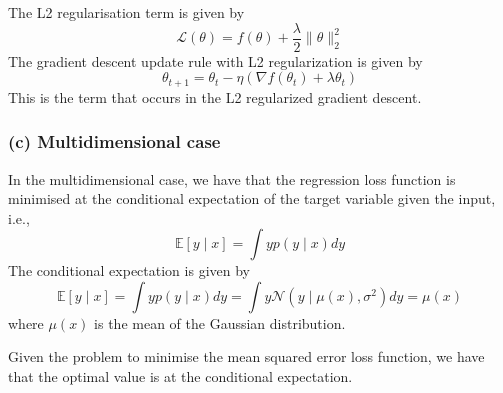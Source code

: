 The L2 regularisation term is given by
\begin{equation*}
      \mathcal{L}(\theta) = f(\theta) + \frac{\lambda}{2} \| \theta \|_2^2
\end{equation*}
The gradient descent update rule with L2 regularization is given by
\begin{equation*}
      \theta_{t+1} = \theta_t - \eta \left( \nabla f(\theta_t) + \lambda \theta_t \right)
\end{equation*}
This is the term that occurs in the L2 regularized gradient descent.

\subsubsection*{(c) Multidimensional case}

In the multidimensional case, we have that the regression loss function is minimised at the conditional expectation of the target variable given the input, i.e.,
\begin{equation*}
      \mathbb{E} \left[ y \mid x \right] = \int y p(y \mid x) dy
\end{equation*}
The conditional expectation is given by
\begin{equation*}
      \mathbb{E} \left[ y \mid x \right] = \int y p(y \mid x) dy = \int y \mathcal{N} \left( y \mid \mu(x), \sigma^2 \right) dy = \mu(x)
\end{equation*}
where \(\mu(x)\) is the mean of the Gaussian distribution.

Given the problem to minimise the mean squared error loss function, we have that the optimal value is at the conditional expectation.
